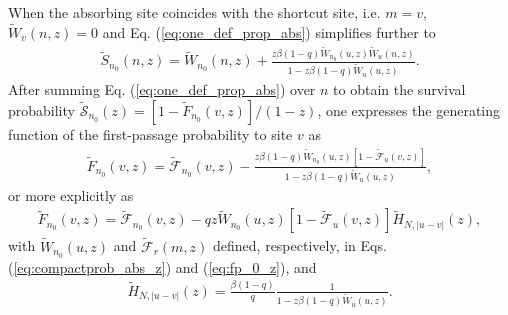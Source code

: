 \documentclass[idelinks, superscriptaddress, amsmath, amssymb, aps, pre]{revtex4-2}
\begin{document}
When the absorbing site coincides with the shortcut site, i.e. $m=v$, $\widetilde{W}_{v}(n,z)=0$ and Eq. (\ref{eq:one_def_prop_abs}) simplifies further to
\begin{align}
\widetilde{S}_{n_0}(n,z)=\widetilde{W}_{n_0}(n,z)+\frac{z\beta (1-q)\widetilde{W}_{n_0}(u,z)\widetilde{W}_{u}(n,z)}{1-z\beta(1-q)\widetilde{W}_{u}(u,z)}.
\label{eq:one_def_prop_abs_2}
\end{align}
After summing Eq. (\ref{eq:one_def_prop_abs}) over $n$ to obtain the survival probability $\widetilde{\mathcal{S}}_{n_0}(z)=\left[1-\widetilde{F}_{n_0}(v,z)\right]/(1-z)$, one expresses the generating function of the first-passage probability to site $v$ as
\begin{align}
\widetilde{F}_{n_0}(v,z)=\widetilde{\mathcal{F}}_{n_0}(v,z)-\frac{z\beta (1-q)\widetilde{W}_{n_0}(u,z)\left[1-\widetilde{\mathcal{F}}_{u}(v,z)\right]}{1-z\beta(1-q)\widetilde{W}_{u}(u,z)},
\label{eq:first_pass_prob}
\end{align}
or more explicitly as
\begin{align}
\widetilde{F}_{n_0}(v,z)=\widetilde{\mathcal{F}}_{n_0}(v,z)-qz\widetilde{W}_{n_0}(u,z)\left[1-\widetilde{\mathcal{F}}_{u}(v,z)\right] \widetilde{H}_{N,|u-v|}(z),
\label{eq:first_pass_prob_2}
\end{align}
with $\widetilde{W}_{n_0}(u,z)$ and $\widetilde{\mathcal{F}}_{r}(m,z)$ defined, respectively, in Eqs. (\ref{eq:compactprob_abs_z}) and (\ref{eq:fp_0_z}), and
 \begin{align}
  \widetilde{H}_{N,|u-v|}(z)=\frac{\beta(1-q)}{q}\frac{1}{1-z\beta(1-q)\widetilde{W}_{u}(u,z)}.
\label{eq:HNuv}
\end{align}
\end{document}
